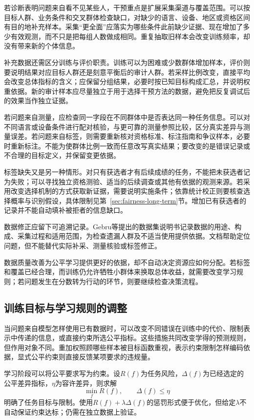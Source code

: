 若诊断表明问题来自看不见某些人，干预重点是扩展采集渠道与覆盖范围。可以按目标人群、业务条件和交叉群体检查缺口，对缺少的语言、设备、地区或资格区间有目的地补充样本。采集“更全面”应落实为哪些条件此前缺少证据、现在增加了多少有效观测，而不只是把每组人数做成相同。重复抽取旧样本会改变训练频率，却没有带来新的个体信息。

补充数据还需区分训练与评价职责。训练可以为困难或少数群体增加样本，评价则要说明结果对应目标人群还是刻意平衡后的审计人群。若采样比例改变，直接平均会改变总体指标的含义；应保留分组结果，必要时按已知目标构成汇总，并说明权重依据。新的审计样本应尽量独立于用于选择干预方法的数据，避免把反复调试后的效果当作独立证据。

若问题来自测量，应检查同一字段在不同群体中是否表达同一种任务信息。可以对不同语言或设备条件进行配对核验，与更可靠的测量参照比较，区分真实差异与测量误差。若问题来自标签，则需要重新核对资格标准、标注指南和争议样本，必要时重新标注。不能为使群体比例一致而任意改写真实结果；要改变的是错误记录或不合理的目标定义，并保留变更依据。

标签缺失又是另一种情形。对只有获选者才有后续成绩的任务，不能把未获选者记为失败；可以寻找独立资格测验、适当的后续调查或其他有依据的观测来源。若采用改变选择机制的方式获取新证据，需要说明实施条件；依靠统计校正则要核查选择概率与识别假设，具体限制见第~\ref{sec:fairness-long-term}节。增加已有获选者的记录并不能自动填补被拒者的信息缺口。

数据修正应留下可追溯记录。Gebru等提出的数据集说明书记录数据的用途、构成、采集过程和适用范围，为检查遗漏人群及不适当使用提供依据。文档帮助定位问题，但不能替代实际补采、测量核验或标签修正。

数据质量改善为公平学习提供更好的依据，却不自动决定资源应如何分配。若标签和覆盖已经合理，而训练仍允许牺牲小群体来换取总体收益，就需要改变学习规则；若问题发生在分数转为行动的环节，则要继续检查决策流程。

\subsection{训练目标与学习规则的调整}
\label{sec:fairness-learning-intervention}

当问题来自模型怎样使用已有数据时，可以改变不同错误在训练中的代价、限制表示中传递的信息，或直接约束所选公平指标。这些措施共同改变学得的预测规则，但作用对象不同。重加权照顾哪些样本被目标函数重视，表示约束限制怎样编码依据，显式公平约束则直接反馈某项要求的违规量。

学习阶段可以将公平要求写为约束。设$R(f)$为任务风险，$\Delta(f)$为已经选定的公平差异指标，$\eta$为容许差异，则求解
\[
 \min_f R(f),\qquad \Delta(f)\leq\eta
\]
明确了任务目标与限制。使用$R(f)+\lambda\Delta(f)$的惩罚形式便于优化，但给定$\lambda$不自动保证约束达标；仍需在独立数据上验证。

